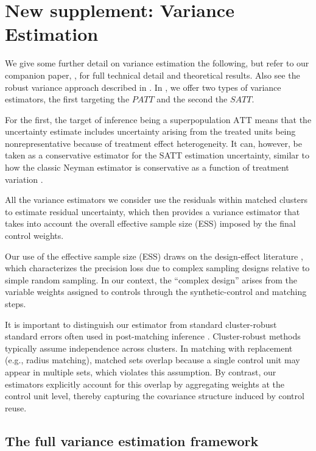 \documentclass[11pt]{article}
\newcommand{\ATT}{\mathrm{ATT}}
\begin{document}
\section{New supplement: Variance Estimation}
\label{app:var-est}

We give some further detail on variance estimation the following, but refer to our companion paper, \citet{meng2025varianceestimationmatchingreweighting}, for full technical detail and theoretical results.
Also see the robust variance approach described in \citet{abadie2006large}.
In \citet{meng2025varianceestimationmatchingreweighting}, we offer two types of variance estimators, the first targeting the $PATT$ and the second the $SATT$.

For the first, the target of inference being a superpopulation $\ATT$ means that the uncertainty estimate includes uncertainty arising from the treated units being nonrepresentative because of treatment effect heterogeneity.
It can, however, be taken as a conservative estimator for the SATT estimation uncertainty, similar to how the classic Neyman estimator is conservative as a function of treatment variation \citep{ding2017bridging}.

All the variance estimators we consider use the residuals within matched clusters to estimate residual uncertainty, which then provides a variance estimator that takes into account the overall effective sample size (ESS) imposed by the final control weights.

Our use of the effective sample size (ESS) draws on the design-effect literature \citep{kish1965survey, lohr2021sampling}, which characterizes the precision loss due to complex sampling designs relative to simple random sampling.
In our context, the ``complex design'' arises from the variable weights assigned to controls through the synthetic-control and matching steps.

It is important to distinguish our estimator from standard cluster-robust standard errors often used in post-matching inference \citep{abadie2022robust}.
Cluster-robust methods typically assume independence across clusters.
In matching with replacement (e.g., radius matching), matched sets overlap because a single control unit may appear in multiple sets, which violates this assumption.
By contrast, our estimators explicitly account for this overlap by aggregating weights at the control unit level, thereby capturing the covariance structure induced by control reuse. 


\subsection{The full variance estimation framework}
\end{document}
